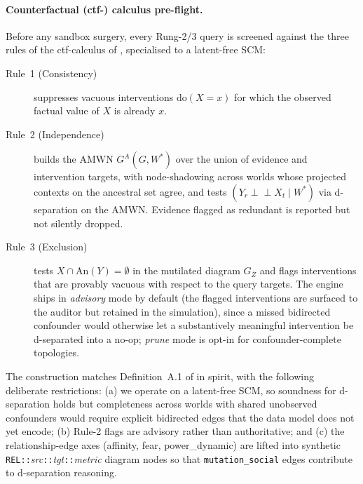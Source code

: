 \documentclass[11pt]{article}
\begin{document}
\paragraph{Counterfactual (ctf-) calculus pre-flight.} Before any
sandbox surgery, every Rung-2/3 query is screened against the
three rules of the ctf-calculus of \citet{correa2025amwn},
specialised to a latent-free SCM:
\begin{description}
  \item[Rule~1 (Consistency)] suppresses vacuous interventions
        $\mathrm{do}(X = x)$ for which the observed factual value
        of $X$ is already $x$.
  \item[Rule~2 (Independence)] builds the AMWN
        $G^A(G, W^*)$ over the union of evidence and intervention
        targets, with node-shadowing across worlds whose projected
        contexts on the ancestral set agree, and tests
        $(Y_r \perp\!\!\!\perp X_t \mid W^*)$ via d-separation on
        the AMWN. Evidence flagged as redundant is reported but
        not silently dropped.
  \item[Rule~3 (Exclusion)] tests
        $X \cap \mathrm{An}(Y) = \emptyset$ in the mutilated
        diagram $G_{\bar Z}$ and flags interventions that are
        provably vacuous with respect to the query targets. The
        engine ships in \emph{advisory} mode by default (the
        flagged interventions are surfaced to the auditor but
        retained in the simulation), since a missed bidirected
        confounder would otherwise let a substantively meaningful
        intervention be d-separated into a no-op; \emph{prune}
        mode is opt-in for confounder-complete topologies.
\end{description}
The construction matches Definition~A.1 of
\citet{correa2025amwn} in spirit, with the following deliberate
restrictions: (a) we operate on a latent-free SCM, so soundness
for d-separation holds but completeness across worlds with
shared unobserved confounders would require explicit bidirected
edges that the data model does not yet encode; (b) Rule-2
flags are advisory rather than authoritative; and (c) the
relationship-edge axes (affinity, fear, power\_dynamic) are
lifted into synthetic
\texttt{REL::}{\textit{src}}\texttt{::}{\textit{tgt}}\texttt{::}{\textit{metric}}
diagram nodes so that
\texttt{mutation\_social} edges contribute to d-separation
reasoning.
\end{document}
